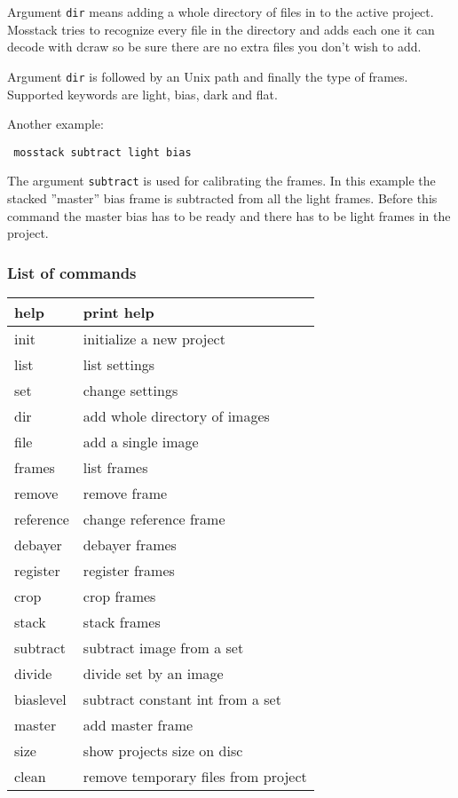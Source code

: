 \documentclass[twoside,a4paper]{refart}
\begin{document}
Argument \texttt{dir} means adding a whole directory of files in to the active project. Mosstack tries to recognize every file
in the directory and adds each one it can decode with dcraw so be sure there are no extra files you don't wish to add.

Argument \texttt{dir} is followed by an Unix path and finally the type of frames. Supported keywords are light, bias, dark and
flat.

Another example:

\begin{verbatim}
 mosstack subtract light bias
\end{verbatim}

The argument \texttt{subtract} is used for calibrating the frames. In this example the stacked ''master'' bias frame is
subtracted from all the light frames. Before this command the master bias has to be ready and there has to be light frames
in the project.


\subsubsection{List of commands}
\label{list of commands}

\begin{tabular}{|l|l|}
\hline
help        & print help \\ \hline
init        & initialize a new project \\ \hline
list        & list settings \\ \hline
set         & change settings \\ \hline
dir         & add whole directory of images\\ \hline
file        & add a single image\\ \hline
frames      & list frames\\ \hline
remove      & remove frame \\ \hline 
reference   & change reference frame \\ \hline
debayer     & debayer frames\\ \hline
register    & register frames\\ \hline
crop        & crop frames\\ \hline
stack       & stack frames\\ \hline
subtract    & subtract image from a set\\ \hline
divide      & divide set by an image\\ \hline
biaslevel   & subtract constant int from a set \\ \hline
master      & add master frame \\ \hline
size        & show projects size on disc \\ \hline
clean       & remove temporary files from project \\ \hline

\end{tabular}
\end{document}
